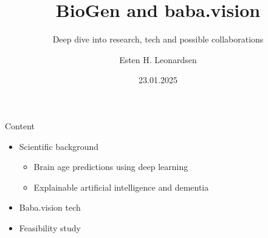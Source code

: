 \documentclass{beamer}
\title{BioGen and baba.vision}
\subtitle{Deep dive into research, tech and possible collaborations}
\date{23.01.2025}
\author{Esten H. Leonardsen}
\begin{document}
    \begin{frame}
        \titlepage
    \end{frame}

    \begin{frame}{Content}
        \begin{itemize}
            \item Scientific background
            \begin{itemize}
                \item Brain age predictions using deep learning
                \item Explainable artificial intelligence and dementia
            \end{itemize}
            \item Baba.vision tech
            \item Feasibility study
        \end{itemize}
    \end{frame}

    
\end{document}
